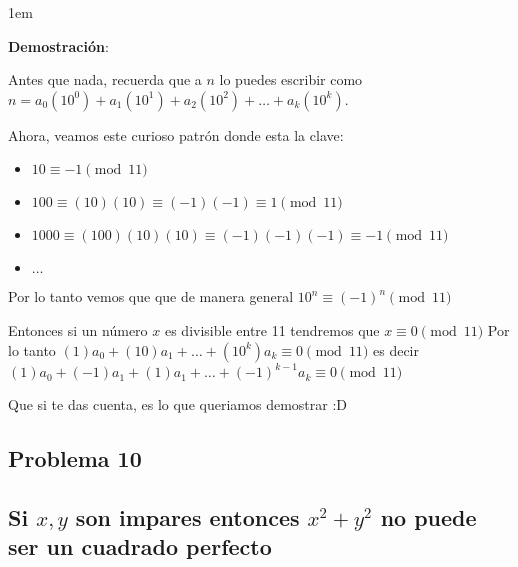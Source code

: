\documentclass[12pt, fleqn]{article}                             %
\newenvironment{SmallIndentation}[1][0.75em]                    %
    {\begin{adjustwidth}{#1}{}\begin{footnotesize}}                 %
    {\end{footnotesize}\end{adjustwidth}}                           %
\begin{document}
        \begin{SmallIndentation}[1em]
            \textbf{Demostración}:

            Antes que nada, recuerda que a $n$ lo puedes escribir como
            $n = a_0(10^0) + a_1(10^1) + a_2(10^2) + \dots + a_k(10^k)$.

            Ahora, veamos este curioso patrón donde esta la clave:
            \begin{itemize}
                 \item $10 \equiv -1 \pmod{11}$
                 \item $100 \equiv (10)(10) \equiv (-1)(-1) \equiv 1 \pmod{11}$
                 \item $1000 \equiv (100)(10)(10) \equiv (-1)(-1)(-1) \equiv -1 \pmod{11}$
                 \item $\dots$
             \end{itemize} 

            Por lo tanto vemos que que de manera general $10^n \equiv (-1)^n \pmod{11}$

            Entonces si un número $x$ es divisible entre 11 tendremos que $x \equiv 0 \pmod{11}$
            Por lo tanto $(1)a_0 + (10)a_1 + \dots +(10^k)a_k \equiv 0 \pmod{11}$
            es decir $(1)a_0 + (-1)a_1 + (1)a_1 +\dots +(-1)^{k-1}a_k \equiv 0 \pmod{11}$

            Que si te das cuenta, es lo que queriamos demostrar :D

        \end{SmallIndentation}



        \subsection{Problema 10}
        \subsection*{Si $x, y$ son impares entonces $x^2 + y^2$ no puede ser un cuadrado
        perfecto}
\end{document}
